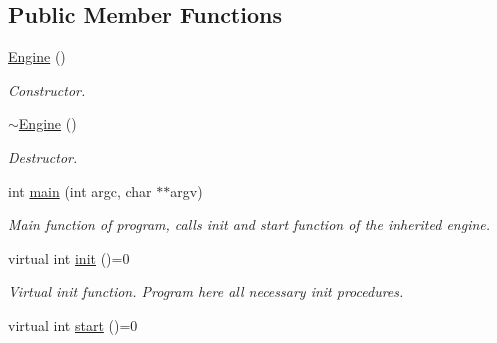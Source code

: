 \subsection*{Public Member Functions}
\begin{DoxyCompactItemize}
\item 
\hypertarget{classEngine_a8c98683b0a3aa28d8ab72a8bcd0d52f2}{
\hyperlink{classEngine_a8c98683b0a3aa28d8ab72a8bcd0d52f2}{Engine} ()}
\label{classEngine_a8c98683b0a3aa28d8ab72a8bcd0d52f2}

\begin{DoxyCompactList}\small\item\em Constructor. \item\end{DoxyCompactList}\item 
\hypertarget{classEngine_a8ef7030a089ecb30bbfcb9e43094717a}{
\hyperlink{classEngine_a8ef7030a089ecb30bbfcb9e43094717a}{$\sim$Engine} ()}
\label{classEngine_a8ef7030a089ecb30bbfcb9e43094717a}

\begin{DoxyCompactList}\small\item\em Destructor. \item\end{DoxyCompactList}\item 
\hypertarget{classEngine_a8464ed1410156a3ccff819373c914297}{
int \hyperlink{classEngine_a8464ed1410156a3ccff819373c914297}{main} (int argc, char $\ast$$\ast$argv)}
\label{classEngine_a8464ed1410156a3ccff819373c914297}

\begin{DoxyCompactList}\small\item\em Main function of program, calls init and start function of the inherited engine. \item\end{DoxyCompactList}\item 
\hypertarget{classEngine_add639334c809cd3e5c5888899df08e39}{
virtual int \hyperlink{classEngine_add639334c809cd3e5c5888899df08e39}{init} ()=0}
\label{classEngine_add639334c809cd3e5c5888899df08e39}

\begin{DoxyCompactList}\small\item\em Virtual init function. Program here all necessary init procedures. \item\end{DoxyCompactList}\item 
\hypertarget{classEngine_a133fbaf71f1fb7a2c7eccc9f3482e923}{
virtual int \hyperlink{classEngine_a133fbaf71f1fb7a2c7eccc9f3482e923}{start} ()=0}
\label{classEngine_a133fbaf71f1fb7a2c7eccc9f3482e923}


\end{DoxyCompactItemize}
